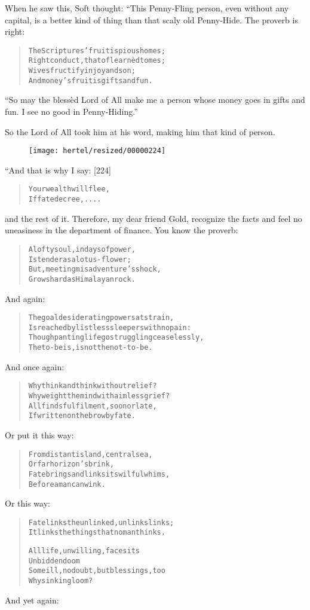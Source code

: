 \documentclass[article, twoside, 10pt]{memoir}
\renewenvironment{verbatim}{%
\begin{quote}%
\vskip -10pt%
\begin{alltt}\normalfont\small}{\end{alltt}%
\end{quote}%
\vskip -10pt
} %
\begin{document}
When he saw this, Soft thought: “This Penny-Fling person, even
without any capital, is a better kind of thing than that scaly old
Penny-Hide. The proverb is right:

\begin{verbatim}
The Scriptures' fruit is pious homes;
Right conduct, that of learnèd tomes;
Wives fructify in joy and son;
And money's fruit is gifts and fun.
\end{verbatim}
``So may the blessèd Lord of All make me a person whose money goes in gifts and fun. I see no good in Penny-Hiding.''

So the Lord of All took him at his word, making him that kind of
person.

\begin{figure}[p]\texttt{[image: hertel/resized/00000224]}\end{figure}“And that is why I say: [224]

\begin{verbatim}
Your wealth will flee,
If fate decree, ....
\end{verbatim}
and the rest of it. Therefore, my dear friend Gold, recognize the
facts and feel no uneasiness in the department of finance. You know
the proverb:

\begin{verbatim}
A lofty soul, in days of power,
Is tender as a lotus-flower;
But, meeting misadventure's shock,
Grows hard as Himalayan rock.
\end{verbatim}
And again:

\begin{verbatim}
The goal desiderating powers at strain,
Is reached by listless sleepers with no pain:
Though panting life go struggling ceaselessly,
The to-be is, is not the not-to-be.
\end{verbatim}
And once again:

\begin{verbatim}
Why think and think without relief?
Why weight the mind with aimless grief?
All finds fulfilment, soon or late,
If written on the brow by fate.
\end{verbatim}
Or put it this way:

\begin{verbatim}
From distant island, central sea,
Or far horizon's brink,
Fate brings and links its wilful whims,
Before a man can wink.
\end{verbatim}
Or this way:

\begin{verbatim}
Fate links the unlinked, unlinks links;
It links the things that no man thinks.

All life, unwilling, faces its
    Unbidden doom{\textemdash}
Some ill, no doubt, but blessings, too{\textemdash}
    Why sink in gloom?
\end{verbatim}
And yet again:
\end{document}
